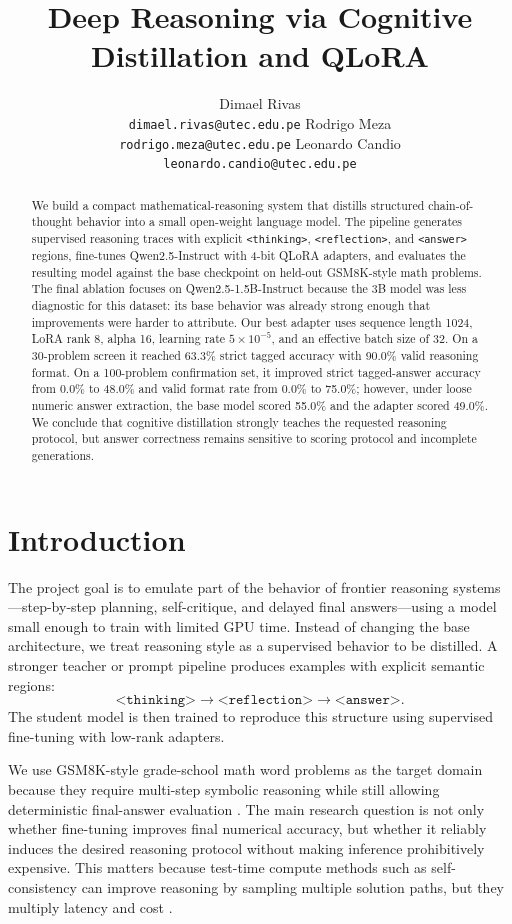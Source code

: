 \documentclass{article}
\title{Deep Reasoning via Cognitive Distillation and QLoRA}
\author{%
  Dimael Rivas\\
  \texttt{dimael.rivas@utec.edu.pe}
  \And
  Rodrigo Meza\\
  \texttt{rodrigo.meza@utec.edu.pe}
  \And
  Leonardo Candio\\
  \texttt{leonardo.candio@utec.edu.pe}
}
\begin{document}
\maketitle

\begin{abstract}
We build a compact mathematical-reasoning system that distills structured chain-of-thought behavior into a small open-weight language model. The pipeline generates supervised reasoning traces with explicit \texttt{<thinking>}, \texttt{<reflection>}, and \texttt{<answer>} regions, fine-tunes Qwen2.5-Instruct with 4-bit QLoRA adapters, and evaluates the resulting model against the base checkpoint on held-out GSM8K-style math problems. The final ablation focuses on Qwen2.5-1.5B-Instruct because the 3B model was less diagnostic for this dataset: its base behavior was already strong enough that improvements were harder to attribute. Our best adapter uses sequence length 1024, LoRA rank 8, alpha 16, learning rate $5\times10^{-5}$, and an effective batch size of 32. On a 30-problem screen it reached 63.3\% strict tagged accuracy with 90.0\% valid reasoning format. On a 100-problem confirmation set, it improved strict tagged-answer accuracy from 0.0\% to 48.0\% and valid format rate from 0.0\% to 75.0\%; however, under loose numeric answer extraction, the base model scored 55.0\% and the adapter scored 49.0\%. We conclude that cognitive distillation strongly teaches the requested reasoning protocol, but answer correctness remains sensitive to scoring protocol and incomplete generations.
\end{abstract}

\section{Introduction}
The project goal is to emulate part of the behavior of frontier reasoning systems---step-by-step planning, self-critique, and delayed final answers---using a model small enough to train with limited GPU time. Instead of changing the base architecture, we treat reasoning style as a supervised behavior to be distilled. A stronger teacher or prompt pipeline produces examples with explicit semantic regions:
\[
\texttt{<thinking>} \rightarrow \texttt{<reflection>} \rightarrow \texttt{<answer>}.
\]
The student model is then trained to reproduce this structure using supervised fine-tuning with low-rank adapters.

We use GSM8K-style grade-school math word problems as the target domain because they require multi-step symbolic reasoning while still allowing deterministic final-answer evaluation \citep{cobbe2021training}. The main research question is not only whether fine-tuning improves final numerical accuracy, but whether it reliably induces the desired reasoning protocol without making inference prohibitively expensive. This matters because test-time compute methods such as self-consistency can improve reasoning by sampling multiple solution paths, but they multiply latency and cost \citep{wang2022selfconsistency}.
\end{document}
